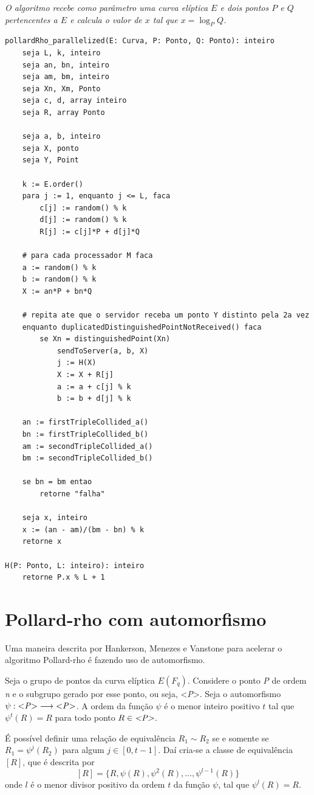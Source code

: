\textit{O algoritmo recebe como parâmetro uma curva elíptica \(E\) e dois pontos \(P\) e \(Q\) pertencentes a \(E\) e calcula o valor de \(x\) tal que $x = \log_P Q$.}

%
%
\begin{lstlisting}[caption={Algoritmo Pollard-rho paralelizado.},label=parallelized]
pollardRho_parallelized(E: Curva, P: Ponto, Q: Ponto): inteiro
	seja L, k, inteiro
	seja an, bn, inteiro
	seja am, bm, inteiro
	seja Xn, Xm, Ponto
	seja c, d, array inteiro
	seja R, array Ponto

	seja a, b, inteiro
	seja X, ponto
	seja Y, Point

	k := E.order()
	para j := 1, enquanto j <= L, faca
		c[j] := random() % k
		d[j] := random() % k
		R[j] := c[j]*P + d[j]*Q

	# para cada processador M faca
	a := random() % k
	b := random() % k
	X := an*P + bn*Q

	# repita ate que o servidor receba um ponto Y distinto pela 2a vez
	enquanto duplicatedDistinguishedPointNotReceived() faca
		se Xn = distinguishedPoint(Xn)
			sendToServer(a, b, X)
			j := H(X)
			X := X + R[j]
			a := a + c[j] % k
			b := b + d[j] % k

	an := firstTripleCollided_a()
	bn := firstTripleCollided_b()
	am := secondTripleCollided_a()
	bm := secondTripleCollided_b()

	se bn = bm entao
		retorne "falha"

	seja x, inteiro
	x := (an - am)/(bm - bn) % k
	retorne x

H(P: Ponto, L: inteiro): inteiro
	retorne P.x % L + 1

\end{lstlisting}

%
%
\section{Pollard-rho com automorfismo}

Uma maneira descrita por Hankerson, Menezes e Vanstone para acelerar o algoritmo Pollard-rho é fazendo uso de automorfismo.\cite{Guide}

Seja o grupo de pontos da curva elíptica $E(F_q)$. Considere o ponto \textit{P} de ordem \textit{n} e o subgrupo gerado por esse ponto, ou seja, <\textit{P}>. Seja o automorfismo $\psi: \mbox{<\textit{P}>}\longrightarrow \mbox{<\textit{P}>}$. A ordem da função $\psi$ é o menor inteiro positivo $t$ tal que $\psi^t(R) = R$ para todo ponto $R \in \mbox{\textit{<P>}}$.

É possível definir uma relação de equivalência $R_1 \sim R_2$ se e somente se $R_1 = \psi^j(R_2)$ para algum $j \in [0, t - 1]$. Daí cria-se a classe de equivalência $[R]$, que é descrita por
$$
[R] = \{R, \psi(R), \psi^2(R), \dots, \psi^{l-1}(R)\}
$$
onde $l$ é o menor divisor positivo da ordem $t$ da função $\psi$, tal que $\psi^l(R) = R$.
